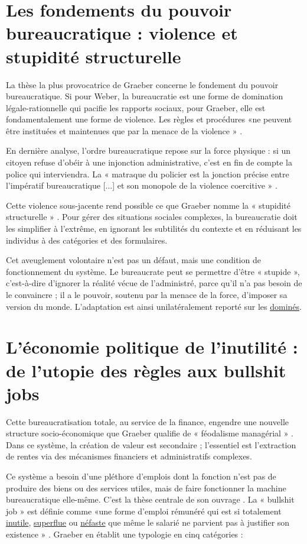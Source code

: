 \section{Les fondements du pouvoir bureaucratique : violence et stupidité structurelle}

La thèse la plus provocatrice de Graeber concerne le fondement du pouvoir bureaucratique. Si pour Weber, la bureaucratie est une forme de domination légale-rationnelle qui pacifie les rapports sociaux, pour Graeber, elle est fondamentalement une forme de violence. Les règles et procédures «ne peuvent être instituées et maintenues que par la menace de la violence » .

En dernière analyse, l'ordre bureaucratique repose sur la force physique : si un citoyen refuse d'obéir à une injonction administrative, c'est en fin de compte la police qui interviendra. La « matraque du policier est la jonction précise entre l'impératif bureaucratique [...] et son monopole de la violence coercitive » .

Cette violence sous-jacente rend possible ce que Graeber nomme la « stupidité structurelle » . Pour gérer des situations sociales complexes, la bureaucratie doit les simplifier à l'extrême, en ignorant les subtilités du contexte et en réduisant les individus à des catégories et des formulaires.

Cet aveuglement volontaire n'est pas un défaut, mais une condition de fonctionnement du système. Le bureaucrate peut se permettre d'être « stupide », c'est-à-dire d'ignorer la réalité vécue de l'administré, parce qu'il n'a pas besoin de le convaincre ; il a le pouvoir, soutenu par la menace de la force, d'imposer sa version du monde. L'adaptation est ainsi unilatéralement reporté sur les \underline{dominés}.

\section{L'économie politique de l'inutilité : de l'utopie des règles aux bullshit jobs}

Cette bureaucratisation totale, au service de la finance, engendre une nouvelle structure socio-économique que Graeber qualifie de « féodalisme managérial » . Dans ce système, la création de valeur est secondaire ; l'essentiel est l'extraction de rentes via des mécanismes financiers et administratifs complexes.

Ce système a besoin d'une pléthore d'emplois dont la fonction n'est pas de produire des biens ou des services utiles, mais de faire fonctionner la machine bureaucratique elle-même. C'est la thèse centrale de son ouvrage \citep{Graeber2018}. La « bullshit job »  est définie comme «une forme d’emploi rémunéré qui est si totalement \underline{inutile}, \underline{superflue} ou \underline{néfaste} que même le salarié ne parvient pas à justifier son existence » . Graeber en établit une typologie en cinq catégories : 

